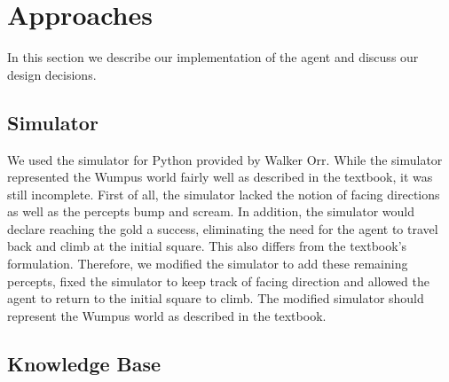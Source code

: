 \section{Approaches}\label{sec:approaches}

In this section we describe our implementation of the agent and discuss our design decisions.

\subsection{Simulator}

We used the simulator for Python provided by Walker Orr. While the simulator represented the Wumpus world fairly well as described in the textbook, it was still incomplete. First of all, the simulator lacked the notion of facing directions as well as the percepts bump and scream. In addition, the simulator would declare reaching the gold a success, eliminating the need for the agent to travel back and climb at the initial square. This also differs from the textbook's formulation. Therefore, we modified the simulator to add these remaining percepts, fixed the simulator to keep track of facing direction and allowed the agent to return to the initial square to climb. The modified simulator should represent the Wumpus world as described in the textbook.

\subsection{Knowledge Base}


